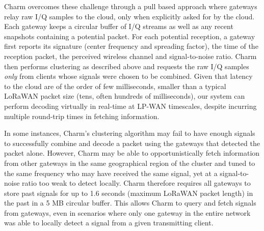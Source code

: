  Charm overcomes these challenge through
a pull based approach where gateways relay raw I/Q samples to the cloud, only
when explicitly asked for by the cloud. Each gateway keeps a circular buffer
of I/Q streams as well as any recent snapshots containing a potential packet.
For each potential reception, a gateway first reports its signature (center
frequency and spreading factor), the time of the reception packet, the
perceived wireless channel and signal-to-noise ratio. Charm then performs
clustering as described above and requests the raw I/Q samples {\it only }
from clients whose signals were chosen to be combined. Given that latency to
the cloud are of the order of few milliseconds, smaller than a typical LoRaWAN
packet size (tens, often hundreds of milliseconds), our system can perform
decoding virtually in real-time at LP-WAN timescales, despite incurring
multiple round-trip times in fetching information.

 In some instances, Charm's
clustering algorithm may fail to have enough signals to successfully combine
and decode a packet using the gateways that detected the packet alone.
However, Charm may be able to opportunistically fetch information from other
gateways in the same geographical region of the cluster and tuned to the same
frequency who may have received the same signal, yet at a signal-to-noise
ratio too weak to detect locally. Charm therefore requires all gateways to
store past signals for up to 1.6 seconds (maximum LoRaWAN packet length) in
the past in a 5 MB circular buffer. This allows Charm to query and fetch
signals from gateways, even in scenarios where only one gateway in the entire
network was able to locally detect a signal from a given transmitting client.